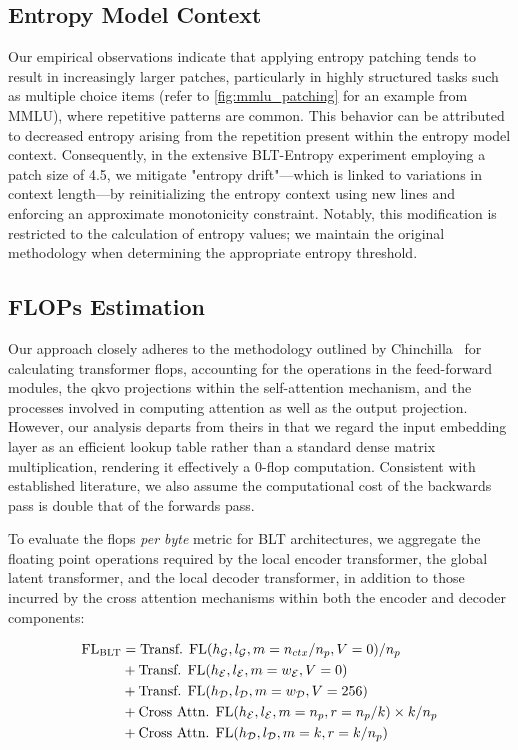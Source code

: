 \subsection{Entropy Model Context}
\label{section:entropy-context}
Our empirical observations indicate that applying entropy patching tends to result in increasingly larger patches, particularly in highly structured tasks such as multiple choice items (refer to \autoref{fig:mmlu_patching} for an example from MMLU), where repetitive patterns are common. This behavior can be attributed to decreased entropy arising from the repetition present within the entropy model context. Consequently, in the extensive {\textsc BLT}-Entropy experiment employing a patch size of 4.5, we mitigate "entropy drift"—which is linked to variations in context length—by reinitializing the entropy context using new lines and enforcing an approximate monotonicity constraint. Notably, this modification is restricted to the calculation of entropy values; we maintain the original methodology when determining the appropriate entropy threshold.

\subsection{FLOPs Estimation} 
\label{section:flops}

Our approach closely adheres to the methodology outlined by Chinchilla~\citep{hoffmann2022training} for calculating transformer flops, accounting for the operations in the feed-forward modules, the qkvo projections within the self-attention mechanism, and the processes involved in computing attention as well as the output projection. However, our analysis departs from theirs in that we regard the input embedding layer as an efficient lookup table rather than a standard dense matrix multiplication, rendering it effectively a 0-flop computation. Consistent with established literature, we also assume the computational cost of the backwards pass is double that of the forwards pass.

To evaluate the flops \textit{per byte} metric for {\textsc BLT} architectures, we aggregate the floating point operations required by the local encoder transformer, the global latent transformer, and the local decoder transformer, in addition to those incurred by the cross attention mechanisms within both the encoder and decoder components:

\begin{align}
    \text{FL}_{\text{{\textsc BLT}}} &= \text{Transf. FL}(h_{\mathcal{G}}, l_{\mathcal{G}}, m=n_{ctx}/n_p,V=0) / n_p\\
   &+ \text{Transf. FL}(h_{\mathcal{E}}, l_{\mathcal{E}}, m=w_{\mathcal{E}}, V=0) \\
   &+ \text{Transf. FL}(h_{\mathcal{D}}, l_{\mathcal{D}}, m=w_{\mathcal{D}}, V=256) \\ 
    &+ \text{Cross Attn. FL}(h_{\mathcal{E}}, l_{\mathcal{E}}, m=n_p, r=n_p/k) \times k/n_p \\ 
   &+ \text{Cross Attn. FL}(h_{\mathcal{D}}, l_{\mathcal{D}}, m=k, r=k/n_p) 
\end{align}

